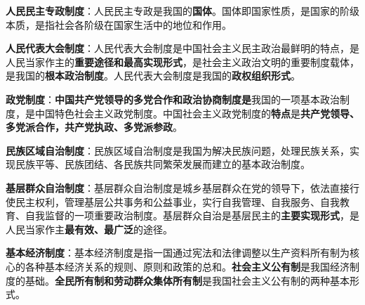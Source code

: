 \textbf{人民民主专政制度}：人民民主专政是我国的{\textbf{国体}}。国体即国家性质，是国家的阶级本质，是指社会各阶级在国家生活中的地位和作用。{}

\textbf{人民代表大会制度}：人民代表大会制度是中国社会主义民主政治最鲜明的特点，是人民当家作主的\textbf{重要途径和最高实现形式}，是社会主义政治文明的重要制度载体，是我国的{\textbf{根本政治制度}}。人民代表大会制度是我国的{\textbf{政权组织形式}}。{}

\textbf{政党制度}：\textbf{中国共产党领导的多党合作和政治协商制度是}我国的一项基本政治制度，是中国特色社会主义政党制度。中国社会主义政党制度的{\textbf{特点}}是\textbf{共产党领导、多党派合作，共产党执政、多党派参政}。{}

\textbf{民族区域自治制度}：民族区域自治制度是我国为解决民族问题，处理民族关系，实现民族平等、民族团结、各民族共同繁荣发展而建立的基本政治制度。{}

\textbf{基层群众自治制度}：基层群众自治制度是城乡基层群众在党的领导下，依法直接行使民主权利，管理基层公共事务和公益事业，实行自我管理、自我服务、自我教育、自我监督的一项重要政治制度。基层群众自治是基层民主的\textbf{主要实现形式}，是人民当家作主\textbf{最有效、最广泛}的途径。{}

\textbf{基本经济制度}：基本经济制度是指一国通过宪法和法律调整以生产资料所有制为核心的各种基本经济关系的规则、原则和政策的总和。{\textbf{社会主义公有制}}是我国经济制度的基础。\textbf{全民所有制和劳动群众集体所有制}是我国社会主义公有制{的两种基本形式。}

